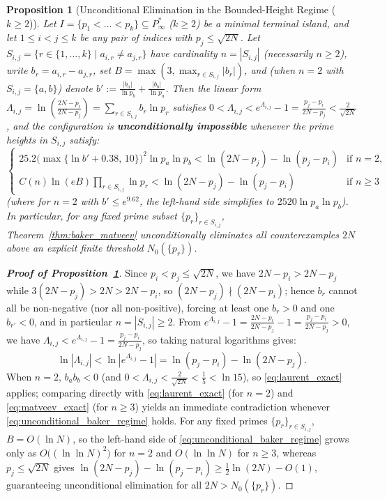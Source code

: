 \documentclass[11pt,a4paper]{article}
\newtheorem{proposition}[theorem]{Proposition}
\theoremstyle{definition}
\begin{document}
\begin{proposition}[Unconditional Elimination in the Bounded-Height Regime ($k \ge 2$)]
\label{prop:bounded_height_elimination}
Let $I = \{p_1 < \dots < p_k\} \subseteq P^*_\infty$ ($k \ge 2$) be a minimal terminal island, and let $1 \le i < j \le k$ be any pair of indices with $p_j \le \sqrt{2N}$. Let $S_{i,j} = \{r \in \{1, \dots, k\} \mid a_{i,r} \neq a_{j,r}\}$ have cardinality $n = |S_{i,j}|$ (necessarily $n \ge 2$), write $b_r = a_{i,r} - a_{j,r}$, set $B = \max(3, \max_{r \in S_{i,j}} |b_r|)$, and (when $n = 2$ with $S_{i,j} = \{a, b\}$) denote $b' := \frac{|b_a|}{\ln p_b} + \frac{|b_b|}{\ln p_a}$. Then the linear form $\Lambda_{i,j} = \ln\left(\frac{2N - p_i}{2N - p_j}\right) = \sum_{r \in S_{i,j}} b_r \ln p_r$ satisfies $0 < \Lambda_{i,j} < e^{\Lambda_{i,j}} - 1 = \frac{p_j - p_i}{2N - p_j} < \frac{2}{\sqrt{2N}}$, and the configuration is \textbf{unconditionally impossible} whenever the prime heights in $S_{i,j}$ satisfy:
\begin{equation}
\label{eq:unconditional_baker_regime}
\begin{cases}
25.2 \bigl(\max\{\ln b' + 0.38, \, 10\}\bigr)^2 \ln p_a \ln p_b < \ln(2N - p_j) - \ln(p_j - p_i) & \text{if } n = 2, \\[4pt]
C(n) \ln(eB) \prod_{r \in S_{i,j}} \ln p_r < \ln(2N - p_j) - \ln(p_j - p_i) & \text{if } n \ge 3
\end{cases}
\end{equation}
(where for $n = 2$ with $b' \le e^{9.62}$, the left-hand side simplifies to $2520 \ln p_a \ln p_b$). In particular, for any fixed prime subset $\{p_r\}_{r \in S_{i,j}}$, Theorem~\ref{thm:baker_matveev} unconditionally eliminates all counterexamples $2N$ above an explicit finite threshold $N_0(\{p_r\})$.
\end{proposition}
\begin{proof}[\textbf{Proof of Proposition~\ref{prop:bounded_height_elimination}}]
Since $p_i < p_j \le \sqrt{2N}$, we have $2N - p_i > 2N - p_j$ while $3(2N - p_j) > 2N > 2N - p_i$, so $(2N - p_j) \nmid (2N - p_i)$; hence $b_r$ cannot all be non-negative (nor all non-positive), forcing at least one $b_r > 0$ and one $b_{r'} < 0$, and in particular $n = |S_{i,j}| \ge 2$. From $e^{\Lambda_{i,j}} - 1 = \frac{2N - p_i}{2N - p_j} - 1 = \frac{p_j - p_i}{2N - p_j} > 0$, we have $\Lambda_{i,j} < e^{\Lambda_{i,j}} - 1 = \frac{p_j - p_i}{2N - p_j}$, so taking natural logarithms gives:
\[
\ln |\Lambda_{i,j}| < \ln |e^{\Lambda_{i,j}} - 1| = \ln(p_j - p_i) - \ln(2N - p_j).
\]
When $n = 2$, $b_a b_b < 0$ (and $0 < \Lambda_{i,j} < \frac{2}{\sqrt{2N}} < \frac{1}{5} < \ln 15$), so \eqref{eq:laurent_exact} applies; comparing directly with \eqref{eq:laurent_exact} (for $n = 2$) and \eqref{eq:matveev_exact} (for $n \ge 3$) yields an immediate contradiction whenever \eqref{eq:unconditional_baker_regime} holds. For any fixed primes $\{p_r\}_{r \in S_{i,j}}$, $B = O(\ln N)$, so the left-hand side of \eqref{eq:unconditional_baker_regime} grows only as $O\bigl((\ln\ln N)^2\bigr)$ for $n = 2$ and $O(\ln\ln N)$ for $n \ge 3$, whereas $p_j \le \sqrt{2N}$ gives $\ln(2N - p_j) - \ln(p_j - p_i) \ge \frac{1}{2}\ln(2N) - O(1)$, guaranteeing unconditional elimination for all $2N > N_0(\{p_r\})$.
\end{proof}
\end{document}
